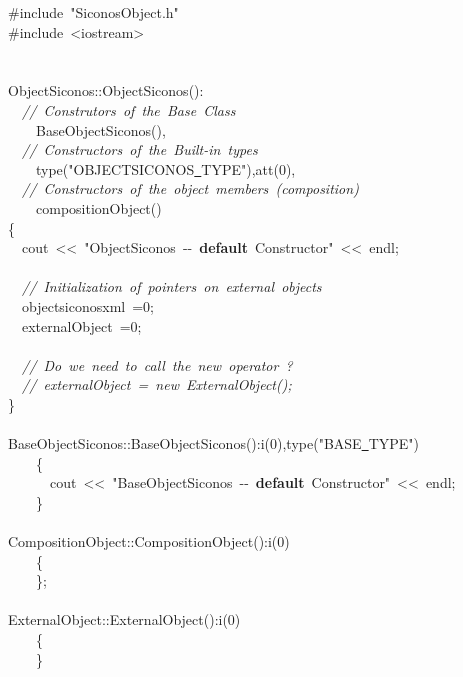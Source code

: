 {\ttfamily \raggedright \small
\#include\ "{}SiconosObject.h"{}\\
\#include\ <{}iostream>{}\\
\ \\
\ \\
ObjectSiconos::ObjectSiconos():\\
\ \ \textsl{//\ Construtors\ of\ the\ Base\ Class}\\
\ \ \ \ BaseObjectSiconos(),\\
\ \ \textsl{//\ Constructors\ of\ the\ Built-{}in\ types}\\
\ \ \ \ type("{}OBJECTSICONOS\underline\ TYPE"{}),att(0),\\
\ \ \textsl{//\ Constructors\ of\ the\ object\ members\ (composition)}\\
\ \ \ \ compositionObject()\\
\{\\
\ \ cout\ <{}<{}\ "{}ObjectSiconos\ -{}-{}\ \textbf{default}\ Constructor"{}\ <{}<{}\ endl;\\
\ \ \\
\ \ \textsl{//\ Initialization\ of\ pointers\ on\ external\ objects}\\
\ \ objectsiconosxml\ =0;\\
\ \ externalObject\ =0;\\
\ \ \\
\ \ \textsl{//\ Do\ we\ need\ to\ call\ the\ new\ operator\ ?}\\
\ \ \textsl{//\ externalObject\ =\ new\ ExternalObject();}\\
\}\\
\ \\
BaseObjectSiconos::BaseObjectSiconos():i(0),type("{}BASE\underline\ TYPE"{})\\
\ \ \ \ \{\ \\
\ \ \ \ \ \ cout\ <{}<{}\ "{}BaseObjectSiconos\ -{}-{}\ \textbf{default}\ Constructor"{}\ <{}<{}\ endl;\\
\ \ \ \ \}\\
\ \\
CompositionObject::CompositionObject():i(0)\\
\ \ \ \ \{\\
\ \ \ \ \};\\
\ \\
ExternalObject::ExternalObject():i(0)\\
\ \ \ \ \{\\
\ \ \ \ \}\\
\ \\
\ \\
 }
\normalfont\normalsize

